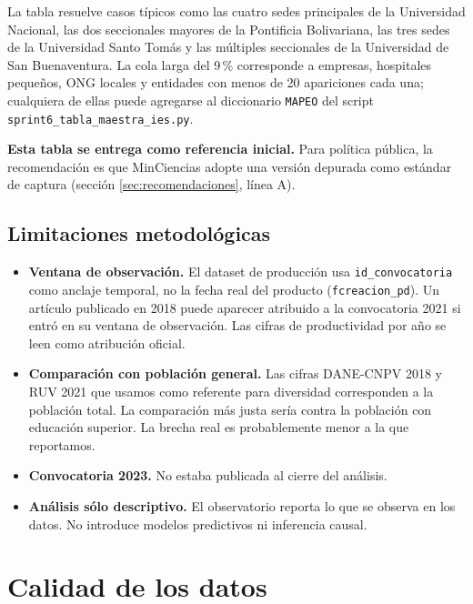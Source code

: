 \documentclass[11pt,a4paper,oneside]{article}
\begin{document}
La tabla resuelve casos típicos como las cuatro sedes principales de la Universidad Nacional, las dos seccionales mayores de la Pontificia Bolivariana, las tres sedes de la Universidad Santo Tomás y las múltiples seccionales de la Universidad de San Buenaventura. La cola larga del 9\,\% corresponde a empresas, hospitales pequeños, ONG locales y entidades con menos de 20 apariciones cada una; cualquiera de ellas puede agregarse al diccionario \texttt{MAPEO} del script \texttt{sprint6\_tabla\_maestra\_ies.py}.

\textbf{Esta tabla se entrega como referencia inicial.} Para política pública, la recomendación es que MinCiencias adopte una versión depurada como estándar de captura (sección \ref{sec:recomendaciones}, línea A).

\subsection{Limitaciones metodológicas}

\begin{itemize}
\item \textbf{Ventana de observación.} El dataset de producción usa \texttt{id\_convocatoria} como anclaje temporal, no la fecha real del producto (\texttt{fcreacion\_pd}). Un artículo publicado en 2018 puede aparecer atribuido a la convocatoria 2021 si entró en su ventana de observación. Las cifras de productividad por año se leen como atribución oficial.
\item \textbf{Comparación con población general.} Las cifras DANE-CNPV 2018 y RUV 2021 que usamos como referente para diversidad corresponden a la población total. La comparación más justa sería contra la población con educación superior. La brecha real es probablemente menor a la que reportamos.
\item \textbf{Convocatoria 2023.} No estaba publicada al cierre del análisis.
\item \textbf{Análisis sólo descriptivo.} El observatorio reporta lo que se observa en los datos. No introduce modelos predictivos ni inferencia causal.
\end{itemize}

\newpage

\section{Calidad de los datos}\label{sec:calidad}
\end{document}
